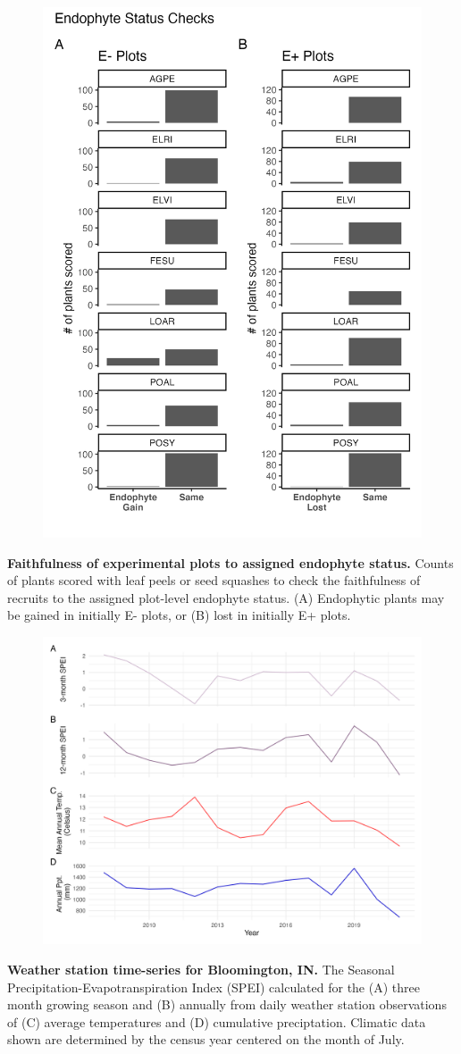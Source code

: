 \documentclass[12pt]{article}
\begin{document}
\begin{figure}
	\centering
	\includegraphics[width=.6\linewidth]{figS8_endo_check_plot.png}
\end{figure}
 \textbf{Faithfulness of experimental plots to assigned endophyte status.} Counts of plants scored with leaf peels or seed squashes to check the faithfulness of recruits to the assigned plot-level endophyte status. (A) Endophytic plants may be gained in initially E- plots, or (B) lost in initially E+ plots.
\newpage

\begin{figure}
	\centering
	\includegraphics[width=\linewidth]{figS9_climate_plot.png}
\end{figure}
 \textbf{Weather station time-series for Bloomington, IN.} The Seasonal Precipitation-Evapotranspiration Index (SPEI) calculated for the (A) three month growing season and (B) annually from daily weather station observations of (C) average temperatures and (D) cumulative preciptation. Climatic data shown are determined by the census year centered on the month of July. %
\newpage
\end{document}
